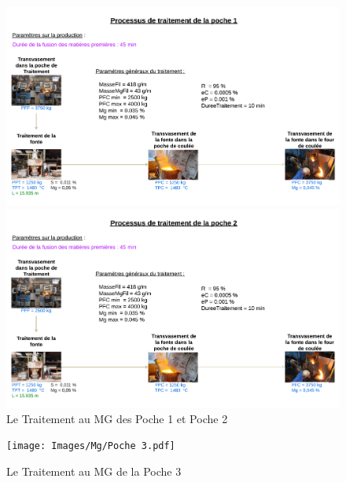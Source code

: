 \documentclass[12pt]{article}
\begin{document}
\begin{figure}[H]
    \centering
    \begin{adjustbox}{height=0.49\textheight,width=1.25\textwidth,center}
        \includegraphics{Images/Mg/Poche 1.pdf} %
    \end{adjustbox}
    
    \vspace{0.01cm} %
    
    \begin{adjustbox}{height=0.49\textheight,width=1.25\textwidth,center}
        \includegraphics{Images/Mg/Poche 2.pdf} %
    \end{adjustbox}

    \caption{Le Traitement au MG des Poche 1 et Poche 2}
    \label{fig:Poche1Et2}
\end{figure}



\begin{figure}[H]
    \centering
    \begin{adjustbox}{width=1.3\textwidth,center}
        \texttt{[image: Images/Mg/Poche 3.pdf]}
    \end{adjustbox}
    \caption{Le Traitement au MG de la Poche 3}
    \label{fig:Poche3}
\end{figure}
\end{document}
